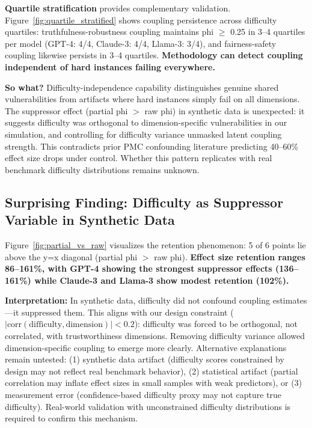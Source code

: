 \textbf{Quartile stratification} provides complementary validation. Figure~\ref{fig:quartile_stratified} shows coupling persistence across difficulty quartiles: truthfulness-robustness coupling maintains phi $\geq$ 0.25 in 3--4 quartiles per model (GPT-4: 4/4, Claude-3: 4/4, Llama-3: 3/4), and fairness-safety coupling likewise persists in 3--4 quartiles. \textbf{Methodology can detect coupling independent of hard instances failing everywhere.}

\textbf{So what?} Difficulty-independence capability distinguishes genuine shared vulnerabilities from artifacts where hard instances simply fail on all dimensions. The suppressor effect (partial phi $>$ raw phi) in synthetic data is unexpected: it suggests difficulty was orthogonal to dimension-specific vulnerabilities in our simulation, and controlling for difficulty variance unmasked latent coupling strength. This contradicts prior PMC confounding literature predicting 40--60\% effect size drops under control. Whether this pattern replicates with real benchmark difficulty distributions remains unknown.

\subsection{Surprising Finding: Difficulty as Suppressor Variable in Synthetic Data}

Figure~\ref{fig:partial_vs_raw} visualizes the retention phenomenon: 5 of 6 points lie above the y=x diagonal (partial phi $>$ raw phi). \textbf{Effect size retention ranges 86--161\%, with GPT-4 showing the strongest suppressor effects (136--161\%) while Claude-3 and Llama-3 show modest retention (102\%).}

\textbf{Interpretation:} In synthetic data, difficulty did not confound coupling estimates---it suppressed them. This aligns with our design constraint ($|\text{corr}(\text{difficulty}, \text{dimension})| < 0.2$): difficulty was forced to be orthogonal, not correlated, with trustworthiness dimensions. Removing difficulty variance allowed dimension-specific coupling to emerge more clearly. Alternative explanations remain untested: (1) synthetic data artifact (difficulty scores constrained by design may not reflect real benchmark behavior), (2) statistical artifact (partial correlation may inflate effect sizes in small samples with weak predictors), or (3) measurement error (confidence-based difficulty proxy may not capture true difficulty). Real-world validation with unconstrained difficulty distributions is required to confirm this mechanism.


